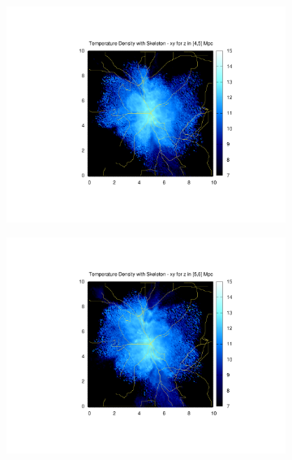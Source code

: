 \documentclass[journal]{IEEEtran}
\begin{document}
\begin{figure}[!t]
\begin{subfigure}[t]{0.3\textwidth}
		\includegraphics[width=\linewidth]{TempDenSkel05.pdf}
	\end{subfigure}
	\quad
	\begin{subfigure}[t]{0.3\textwidth}
		\centering
		\includegraphics[width=\linewidth]{TempDenSkel06.pdf}
	\end{subfigure}
	\\
	\begin{subfigure}[t]{0.3\textwidth}
		\centering

\end{subfigure}
\end{figure}
\end{document}
